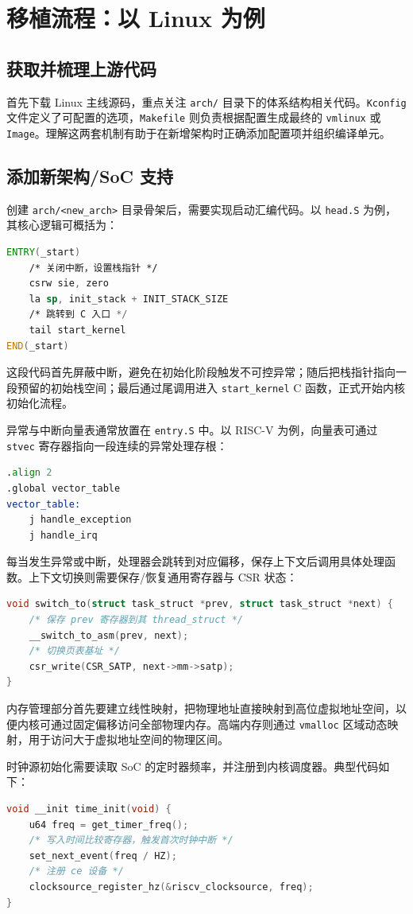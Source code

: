 \chapter{移植流程：以 Linux 为例}
\section{获取并梳理上游代码}
首先下载 Linux 主线源码，重点关注 \texttt{arch/} 目录下的体系结构相关代码。\texttt{Kconfig} 文件定义了可配置的选项，\texttt{Makefile} 则负责根据配置生成最终的 \texttt{vmlinux} 或 \texttt{Image}。理解这两套机制有助于在新增架构时正确添加配置项并组织编译单元。\par
\section{添加新架构/SoC 支持}
创建 \texttt{arch/<new\_{}arch>} 目录骨架后，需要实现启动汇编代码。以 \texttt{head.S} 为例，其核心逻辑可概括为：\par
\begin{lstlisting}[language=asm]
ENTRY(_start)
    /* 关闭中断，设置栈指针 */
    csrw sie, zero
    la sp, init_stack + INIT_STACK_SIZE
    /* 跳转到 C 入口 */
    tail start_kernel
END(_start)
\end{lstlisting}
这段代码首先屏蔽中断，避免在初始化阶段触发不可控异常；随后把栈指针指向一段预留的初始栈空间；最后通过尾调用进入 \texttt{start\_{}kernel} C 函数，正式开始内核初始化流程。\par
异常与中断向量表通常放置在 \texttt{entry.S} 中。以 RISC-V 为例，向量表可通过 \texttt{stvec} 寄存器指向一段连续的异常处理存根：\par
\begin{lstlisting}[language=asm]
.align 2
.global vector_table
vector_table:
    j handle_exception
    j handle_irq
\end{lstlisting}
每当发生异常或中断，处理器会跳转到对应偏移，保存上下文后调用具体处理函数。上下文切换则需要保存/恢复通用寄存器与 CSR 状态：\par
\begin{lstlisting}[language=c]
void switch_to(struct task_struct *prev, struct task_struct *next) {
    /* 保存 prev 寄存器到其 thread_struct */
    __switch_to_asm(prev, next);
    /* 切换页表基址 */
    csr_write(CSR_SATP, next->mm->satp);
}
\end{lstlisting}
内存管理部分首先要建立线性映射，把物理地址直接映射到高位虚拟地址空间，以便内核可通过固定偏移访问全部物理内存。高端内存则通过 \texttt{vmalloc} 区域动态映射，用于访问大于虚拟地址空间的物理区间。\par
时钟源初始化需要读取 SoC 的定时器频率，并注册到内核调度器。典型代码如下：\par
\begin{lstlisting}[language=c]
void __init time_init(void) {
    u64 freq = get_timer_freq();
    /* 写入时间比较寄存器，触发首次时钟中断 */
    set_next_event(freq / HZ);
    /* 注册 ce 设备 */
    clocksource_register_hz(&riscv_clocksource, freq);
}
\end{lstlisting}
